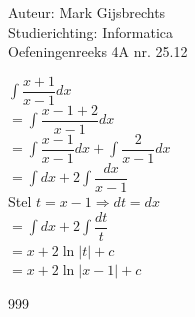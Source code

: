 \documentclass[a4paper]{article}
\newcommand{\dint}{\displaystyle\int}
\begin{document}
\noindent \large Auteur: Mark Gijsbrechts \\
\noindent \large Studierichting: Informatica\\
\noindent \large Oefeningenreeks 4A nr. 25.12\\

\medskip

\normalsize





$\dint \dfrac{x+1}{x-1} dx $ \\

$= \dint \dfrac{x-1+2}{x-1} dx $ \\

$= \dint \dfrac{x-1}{x-1} dx + \dint \dfrac{2}{x-1} dx $ \\

$= \dint dx + 2\dint \dfrac{dx}{x-1} $ \\

Stel $ t = x - 1 \Rightarrow dt = dx $ \\

$= \dint dx + 2\dint \dfrac{dt}{t} $ \\

$= x + 2 \ln|t| + c $ \\

$= x + 2 \ln|x-1| + c $ \\



\begin{thebibliography}{999}
\end{thebibliography}
\end{document}
